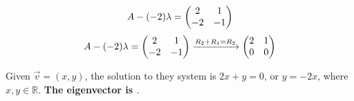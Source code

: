 \documentclass{article}
\begin{document}
{{		\[
		A-(-2)\lambda = 
			\left(\begin{array}{@{}cc@{}}
			2  &  1 \\
			-2 & -1 \\
		\end{array}\right) 
		\]
		\[
		A-(-2)\lambda = 
		\left(\begin{array}{@{}cc@{}}
			2  &  1 \\
			-2 & -1 \\
		\end{array}\right) \xrightarrow[]{R_2 + R_1 = R_2}
		\left(\begin{array}{@{}cc@{}}
			2  &  1 \\
			0 & 0 \\
		\end{array}\right)
		\]
		\par\noindent Given \( \vec v = (x,y)\), the solution to they system is \(2x + y =0\), or \(y = -2x\), where \(x,y \in \mathbb{R}\). \textbf{The eigenvector is \(<1,-2>\)}.
	}}
\newpage
\end{document}
